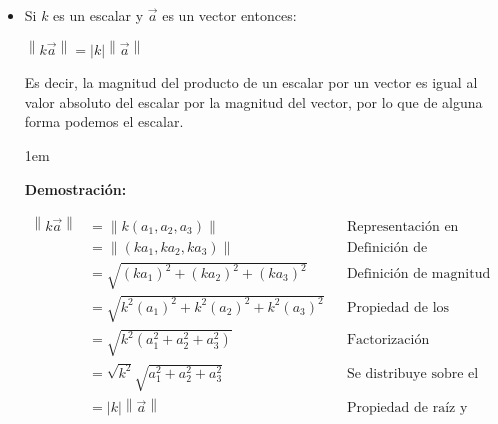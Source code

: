 \documentclass[12pt, fleqn]{report}                             %
\newenvironment{SmallIndentation}[1][0.75em]                    %
        {\begin{adjustwidth}{#1}{}\begin{footnotesize}}             %
        {\end{footnotesize}\end{adjustwidth}}                       %
\newcommand \Quote              {\qq}                           %
\theoremstyle{break}                                            %
\newcommand{\abs}[1]    {\left\lvert #1 \right\lvert}           %
\newcommand{\Abs}[1]    {\left\lVert #1 \right\lVert}           %
\begin{document}
                \begin{itemize}
                    
                    \item Si $k$ es un escalar y $\vec{a}$ es un vector entonces:
                    
                        $\Abs{k\vec{a}} = \abs{k} \Abs{\vec{a}}$
                        
                        Es decir, la magnitud del producto de un escalar por un vector es
                        igual al valor absoluto del escalar por la magnitud del vector,
                        por lo que de alguna forma podemos \Quote{sacar} el escalar.
                            
                        \begin{SmallIndentation}[1em]
                            \textbf{Demostración:}

                            \begin{align*}
                                \Abs{k\vec{a}}
                                    &= \Abs{k(a_1, a_2, a_3)}                       &&\mbox{Representación en Coordenadas}             \\
                                    &= \Abs{(ka_1, ka_2, ka_3)}                     &&\mbox{Definición de multiplicación por escalar}  \\
                                    &= \sqrt{(ka_1)^2 + (ka_2)^2 + (ka_3)^2}        &&\mbox{Definición de magnitud}                    \\
                                    &= \sqrt{k^2(a_1)^2 + k^2(a_2)^2 + k^2(a_3)^2}  &&\mbox{Propiedad de los exponentes en los reales} \\
                                    &= \sqrt{k^2(a_1^2 + a_2^2 + a_3^2)}            &&\mbox{Factorización}                             \\
                                    &= \sqrt{k^2}\sqrt{a_1^2 + a_2^2 + a_3^2}       &&\mbox{Se distribuye sobre el producto de reales} \\
                                    &= \abs{k} \Abs{\vec{a}}                        &&\mbox{Propiedad de raíz y definición de magnitud}
                            \end{align*}

                        \end{SmallIndentation}

                \end{itemize}
\end{document}
